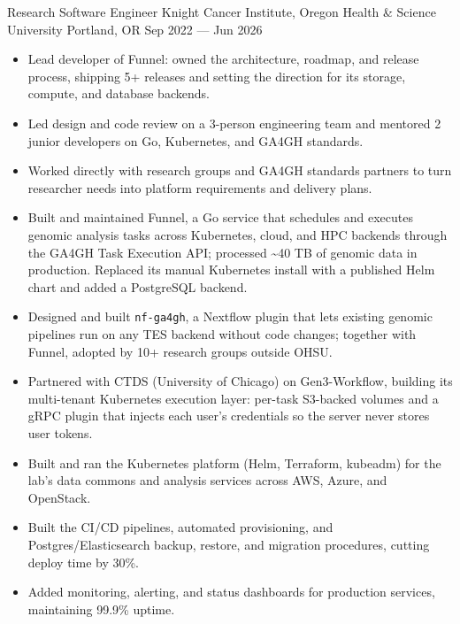 \showoff
{Research Software Engineer}
{Knight Cancer Institute, Oregon Health \& Science University}
{Portland, OR}
{Sep 2022 --- Jun 2026}


\begin{itemize}
    \item Lead developer of Funnel: owned the architecture, roadmap, and release process, shipping 5+ releases and setting the direction for its storage, compute, and database backends.
    \item Led design and code review on a 3-person engineering team and mentored 2 junior developers on Go, Kubernetes, and GA4GH standards.
    \item Worked directly with research groups and GA4GH standards partners to turn researcher needs into platform requirements and delivery plans.
\end{itemize}


\begin{itemize}
    \item Built and maintained Funnel, a Go service that schedules and executes genomic analysis tasks across Kubernetes, cloud, and HPC backends through the GA4GH Task Execution API; processed \textasciitilde40 TB of genomic data in production. Replaced its manual Kubernetes install with a published Helm chart and added a PostgreSQL backend.
    \item Designed and built \texttt{nf-ga4gh}, a Nextflow plugin that lets existing genomic pipelines run on any TES backend without code changes; together with Funnel, adopted by 10+ research groups outside OHSU.
    \item Partnered with CTDS (University of Chicago) on Gen3-Workflow, building its multi-tenant Kubernetes execution layer: per-task S3-backed volumes and a gRPC plugin that injects each user's credentials so the server never stores user tokens.
\end{itemize}


\begin{itemize}
    \item Built and ran the Kubernetes platform (Helm, Terraform, kubeadm) for the lab's data commons and analysis services across AWS, Azure, and OpenStack.
    \item Built the CI/CD pipelines, automated provisioning, and Postgres/Elasticsearch backup, restore, and migration procedures, cutting deploy time by 30\%.
    \item Added monitoring, alerting, and status dashboards for production services, maintaining 99.9\% uptime.
\end{itemize}
